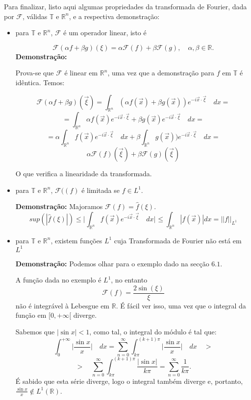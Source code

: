 \documentclass{article}
\begin{document}
Para finalizar, listo aqui algumas propriedades da transformada de Fourier, dada por \(\mathcal{F}\), válidas \(\mathbb{T}\) e \(\mathbb{R}^{n}\), e a respectiva demonstração:
\begin{itemize}
    \item para \(\mathbb{T}\) e \(\mathbb{R}^{n}\), \(\mathcal{F}\) é um operador linear, isto é
    
    \[\mathcal{F}(\alpha f+\beta g)(\xi)=\alpha\mathcal{F}(f)+\beta\mathcal{F}(g),\quad\alpha,\beta\in\mathbb{R}.\] 
    \textbf{Demonstração:}
    
    Prova-se que \(\mathcal{F}\) é linear em \(\mathbb{R}^{n}\), uma vez que a demonstração para \(f\) em \(\mathbb{T}\) é idêntica. Temos:
    
    \[\mathcal{F}(\alpha f+\beta g)(\vec{\xi})=\displaystyle\int_{\mathbb{R}^{n}}(\alpha f(\vec{x})+\beta g(\vec{x}))e^{-i\vec{x}\cdot\vec{\xi}}\quad dx=\]
    \[=\displaystyle\int_{\mathbb{R}^{n}}\alpha f(\vec{x})e^{-i\vec{x}\cdot\vec{\xi}}+\beta g(\vec{x})e^{-i\vec{x}\cdot\vec{\xi}}\quad dx=\]
    \[=\alpha\displaystyle\int_{\mathbb{R}^{n}}f(\vec{x})e^{-i\vec{x}\cdot\vec{\xi}}\quad dx +\beta\displaystyle\int_{\mathbb{R}^{n}}g(\vec{x}))e^{-i\vec{x}\cdot\vec{\xi}}\quad dx=\]
    \[\alpha\mathcal{F}(f)(\vec{\xi})+\beta\mathcal{F}(g)(\vec{\xi})\]
    
    O que verifica a linearidade da transformada.
    \item para \(\mathbb{T}\) e \(\mathbb{R}^{n}\), \(\mathcal{F}((f)\) é limitada se \(f\in L^{1}\).
    
\textbf{Demonstração:}
Majoramos\cite{maggie2} \(\mathcal{F}(f)=\hat{f}(\xi)\).
\[sup(|\hat{f}(\xi)|)\leq \Biggr|_{}\displaystyle\int_{\mathbb{R}^{n}}f(\vec{x})e^{-i\vec{x}\cdot\vec{\xi}}\quad dx\Biggr|_{}\leq\displaystyle\int_{\mathbb{R}^{n}}|f(\vec{x})| dx = ||f||_{L^{1}}\]
    \item para \(\mathbb{T}\) e \(\mathbb{R}^{n}\), existem funções \(L^{1}\) cuja Transformada de Fourier não está em \(L^{1}\)
    
\textbf{Demonstração:}
Podemos olhar para o exemplo dado na secção \(\mathbf{6.1}\).

A função dada no exemplo é \(L^{1}\), no entanto
\[\mathcal{F}(f)= \frac{2\sin(\xi)}{\xi}\] não é integrável à Lebesgue em \(\mathbb{R}\). É fácil ver isso, uma vez que o integral da função em \([0,+\infty[\) diverge.

Sabemos que \(|\sin{x}|<1\), como tal, o integral do módulo é tal que:
\[\displaystyle\int_{0}^{+\infty}\Biggr| \frac{\sin{x}}{x}\Biggr|\quad dx= \displaystyle\sum_{n=0}^{\infty}\displaystyle\int_{k\pi}^{(k+1)\pi}\Biggr| \frac{\sin{x}}{x}\Biggr|\quad dx\quad >\]
\[>\quad\displaystyle\sum_{n=0}^{\infty}\displaystyle\int_{k\pi}^{(k+1)\pi}\frac{|\sin{x}|}{k\pi}=\displaystyle\sum_{n=0}^{\infty}\frac{1}{k\pi}.\]
É sabido que esta série diverge, logo o integral também diverge e, portanto, \(\frac{\sin{x}}{x}\notin L^{1}(\mathbb{R})\).

\end{itemize}

\end{document}

